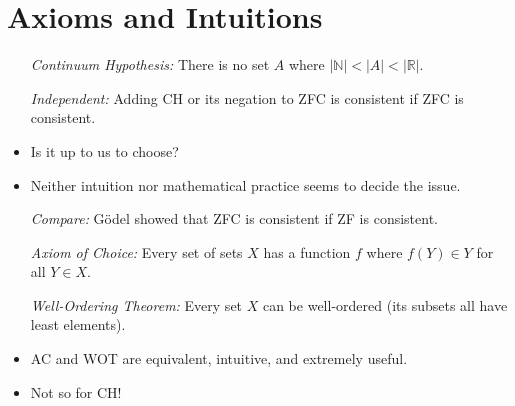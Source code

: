 \documentclass[a4paper, 11pt]{article} %
\newcommand{\abs}[1]{|#1|} %
\newcommand{\N}{\mathbb{N}}
\newcommand{\R}{\mathbb{R}}
\begin{document}
\section*{Axioms and Intuitions}

\begin{itemize}
  \item[\it Continuum Hypothesis:] There is no set $A$ where $\abs{\N} < \abs{A} < \abs{\R}$.
  \item[\it Independent:] Adding CH or its negation to ZFC is consistent if ZFC is consistent.
  \item Is it up to us to choose?
  \item Neither intuition nor mathematical practice seems to decide the issue.
  \item[\it Compare:] G\"{o}del showed that ZFC is consistent if ZF is consistent.
  \item[\it Axiom of Choice:] Every set of sets $X$ has a function $f$ where $f(Y)\in Y$ for all $Y\in X$. 
  \item[\it Well-Ordering Theorem:] Every set $X$ can be well-ordered (its subsets all have least elements). 
  \item AC and WOT are equivalent, intuitive, and extremely useful.
  \item Not so for CH!
\end{itemize}
\end{document}
